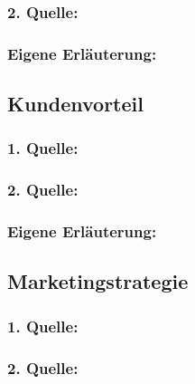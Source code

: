         \subsubsection*{2. Quelle:}
        \begin{abstract}
        \end{abstract}
        \subsubsection*{Eigene Erläuterung:}
        \begin{abstract}
        \end{abstract}
    \subsection{Kundenvorteil}
        \subsubsection*{1. Quelle:}
        \begin{abstract}
        \end{abstract}
        \subsubsection*{2. Quelle:}
        \begin{abstract}
        \end{abstract}
        \subsubsection*{Eigene Erläuterung:}
        \begin{abstract}
        \end{abstract}
    \subsection{Marketingstrategie}
        \subsubsection*{1. Quelle:}
        \begin{abstract}
        \end{abstract}
        \subsubsection*{2. Quelle:}
        \begin{abstract}
        \end{abstract}
